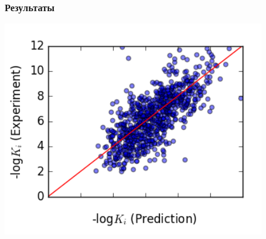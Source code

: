\documentclass{beamer}
\begin{document}
\begin{frame}
\frametitle{Результаты}

\begin{center}
\includegraphics[scale=0.6]{res.png}
\end{center}
\end{frame}
\end{document}
